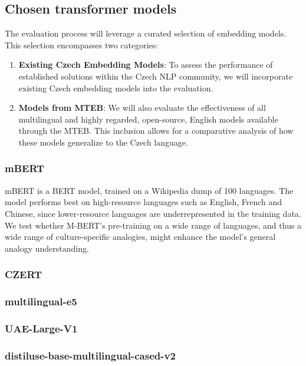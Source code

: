 \subsection{Chosen transformer models}

The evaluation process will leverage a curated selection of embedding models. This selection encompasses two categories:

\begin{enumerate}
  \item \textbf{Existing Czech Embedding Models}: To assess the performance of established solutions within the Czech \ac{NLP} community, we will incorporate existing Czech embedding models into the evaluation.
  \item \textbf{Models from \ac{MTEB}}: We will also evaluate the effectiveness of all multilingual and highly regarded, open-source, English models available through the \ac{MTEB}. This inclusion allows for a comparative analysis of how these models generalize to the Czech language.
\end{enumerate}





\subsubsection{mBERT}
\ac{mBERT} is a \ac{BERT} model, trained on a Wikipedia dump of 100 languages.
The model performs best on high-resource languages such as English, French and Chinese, since lower-resource languages are underrepresented in the training data.
We test whether M-BERT's pre-training on a wide range of languages, and thus a wide range of culture-specific analogies, might enhance the model's general analogy understanding.

\subsubsection{CZERT}

\subsubsection{multilingual-e5}

\subsubsection{UAE-Large-V1}

\subsubsection{distiluse-base-multilingual-cased-v2}

